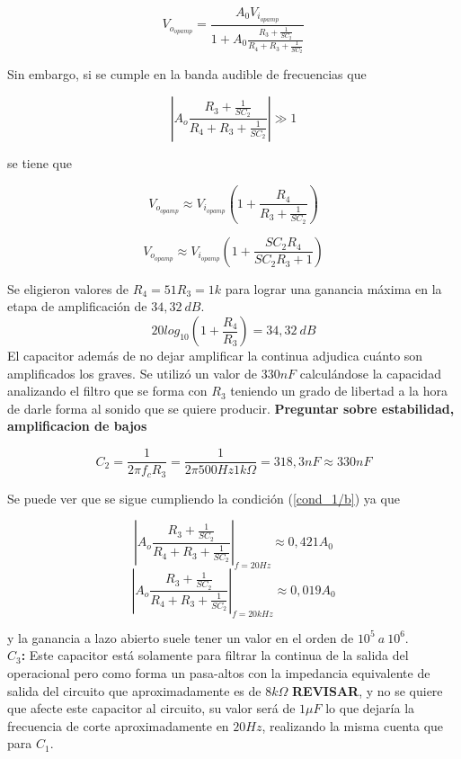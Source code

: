 \begin{equation}
	V_{o_{opamp}} = \frac{A_0 V_{i_{opamp}}}{1+A_0 \frac{R_3 + \frac{1}{SC_2}}{R_4 + R_3 + \frac{1}{SC_2}}}
\end{equation}

Sin embargo, si se cumple en la banda audible de frecuencias que

\begin{equation}
\left| A_o\frac{R_3 + \frac{1}{SC_2}}{R_4 + R_3 + \frac{1}{SC_2}} \right| \gg 1
\label{cond_1/b}
\end{equation}

se tiene que

\begin{equation}
V_{o_{opamp}} \approx V_{i_{opamp}}\left( 1 + \frac{R_4}{R_3 + \frac{1}{SC_2}}  \right)
\end{equation}

\begin{equation}
	V_{o_{opamp}} \approx V_{i_{opamp}}\left( 1 + \frac{SC_2R_4}{SC_2R_3 + 1}  \right)
\end{equation}

Se eligieron valores de $R_4=51R_3=1k$ para lograr una ganancia máxima en la etapa de amplificación de $34, 32 \ dB$.
\[20log_{10}(1+\frac{R_4}{R_3}) = 34,32 \ dB\]
El capacitor además de no dejar amplificar la continua adjudica cuánto son amplificados los graves. Se utilizó un valor de $330nF$ calculándose la capacidad analizando el filtro que se forma con $R_3$ teniendo un grado de libertad a la hora de darle forma al sonido que se quiere producir. \textbf{Preguntar sobre estabilidad, amplificacion de bajos}

\[ C_2 = \frac{1}{2\pi f_c R_3} = \frac{1}{2\pi 500Hz 1k\Omega} = 318,3nF \approx 330nF \]

Se puede ver que se sigue cumpliendo la condición (\ref{cond_1/b}) ya que

$$ \left| A_o\frac{R_3 + \frac{1}{SC_2}}{R_4 + R_3 + \frac{1}{SC_2}} \right|_{f=20Hz} \approx 0,421A_0 $$
$$ \left| A_o\frac{R_3 + \frac{1}{SC_2}}{R_4 + R_3 + \frac{1}{SC_2}} \right|_{f=20kHz} \approx 0,019A_0 $$

y la ganancia a lazo abierto suele tener un valor en el orden de $10^5 \ a \ 10^6 $.\\

\textbf{$C_3$:} Este capacitor está solamente para filtrar la continua de la salida del operacional pero como forma un pasa-altos con la impedancia equivalente de salida del circuito que aproximadamente es de $8k\Omega$ \textbf{REVISAR}, y no se quiere que afecte este capacitor al circuito, su valor será de $1\mu F$ lo que dejaría la frecuencia de corte aproximadamente en $20Hz$, realizando la misma cuenta que para $C_1$.\\

